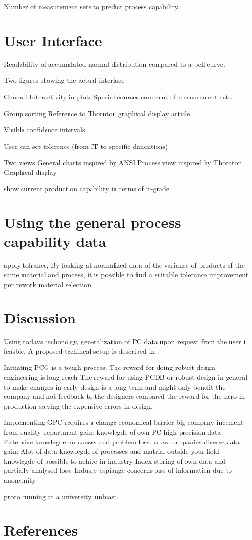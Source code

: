 \documentclass[aip,amsmath, reprint, author-year]{revtex4-1}
\begin{document}
Number of measurement sets to predict process capability.  


\section{User Interface}

Readability of accumulated normal distribution compared to a bell curve.

Two figures showing the actual interface

General
	Interactivity in plots 
		Special courses comment of measurement sets.
	
	Group sorting
		Reference to Thornton graphical display article.

	Visible confidence intervals

	User can set tolerence (from IT to specific dimentions)

Two views
	General charts inspired by ANSI
	Process view inspired by Thornton Graphical display





show current production capability in terms of it-grade

\section{Using the general process capability data}
apply tolrance, By looking at normalized data of the variance of products of the same material and process, it is possible to find a suitable tolerance
improvement per rework
material selection


\section{Discussion}

Using todays techonolgy, generalization of PC data upon request from the user i feasble. A proposed techincal setup is described in \cite{OkholmRask}.

Initiating PCG is a tough process. 
The reward for doing robust design engineering is long reach
The reward for using PCDB or robust design in general to make changes in early design is a long term and might only benefit the company and not feedback to the designers compared the reward for the hero in production solving the expensive errors in design.

Implementing GPC requires a change
	economical barrier
		big company
			incement from quality department
			gain: 	knowlegde of own PC
					high precision data
					Extensive knowlegde on causes and problem
			loss:
		cross companies
			diverse data
			gain:		Alot of data
					knowlegde of processes and matrial outside your field
					knowlegde of possible to achive in industry
					Index storing of own data and partially analysed
			loss:		Indusry espiange concerns
					loss of information due to anonymity

proto running at a university, unbiast.


\section*{References}

\end{document}
